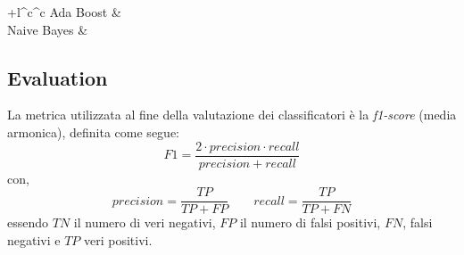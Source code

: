 \begin{center}
\begin{tabular}{+l^c^c}
						 \midrule
						 Ada Boost &   \\
						 \midrule
						 Naive Bayes &  \\
 
                		\toprule\rowstyle{\bfseries}
                	\end{tabular}
                	\label{tab:f1scoreML}
                \end{center}
                

        \subsection{Evaluation}
        
                La metrica utilizzata al fine della valutazione dei classificatori è la \textit{f1-score} (media armonica), definita come segue:
                \begin{displaymath}
                F1 = \frac{2 \cdot precision \cdot recall}{precision + recall}
                \end{displaymath}
                con,
                \begin{displaymath}
                precision = \frac{TP}{TP + FP} \qquad recall = \frac{TP}{TP + FN}
                \end{displaymath}
                essendo $TN$ il numero di veri negativi, $FP$ il numero di falsi positivi, $FN$, falsi negativi e $TP$ veri positivi.